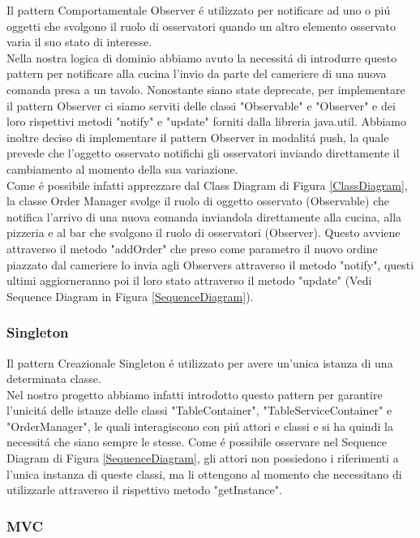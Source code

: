 \documentclass{article}
\begin{document}
Il pattern Comportamentale Observer \'e utilizzato per notificare ad uno o pi\'u oggetti che svolgono il ruolo di osservatori quando un altro elemento osservato varia il suo stato di interesse. \\
Nella nostra logica di dominio abbiamo avuto la necessit\'a di introdurre questo pattern per notificare alla cucina l'invio da parte del cameriere di una nuova comanda presa a un tavolo. Nonostante siano state deprecate, per implementare il pattern Observer ci siamo serviti delle classi "Observable" e "Observer" e dei loro rispettivi metodi "notify" e "update" forniti dalla libreria java.util. Abbiamo inoltre deciso di implementare il pattern Observer in modalit\'a push, la quale prevede che l'oggetto osservato notifichi gli osservatori inviando direttamente il cambiamento al momento della sua variazione. \\ Come \'e possibile infatti apprezzare dal Class Diagram di Figura \ref{ClassDiagram}, la classe Order Manager svolge il ruolo di oggetto osservato (Observable) che notifica l'arrivo di una nuova comanda inviandola direttamente alla cucina, alla pizzeria e al bar che svolgono il ruolo di osservatori (Observer). Questo avviene attraverso il metodo "addOrder" che preso come parametro il nuovo ordine piazzato dal cameriere lo invia agli Observers attraverso il metodo "notify", questi ultimi aggiorneranno poi il loro stato attraverso il metodo "update" (Vedi Sequence Diagram in Figura \ref{SequenceDiagram}).

\newpage

\subsubsection{Singleton}

Il pattern Creazionale Singleton \'e utilizzato per avere un'unica istanza di una determinata classe. \\
Nel nostro progetto abbiamo infatti introdotto questo pattern per garantire l'unicit\'a delle istanze delle classi "TableContainer", "TableServiceContainer" e "OrderManager", le quali interagiscono con pi\'u attori e classi e si ha quindi la necessit\'a che siano sempre le stesse. Come \'e possibile osservare nel Sequence Diagram di Figura \ref{SequenceDiagram}, gli attori non possiedono i riferimenti a l'unica instanza di queste classi, ma li ottengono al momento che necessitano di utilizzarle attraverso il rispettivo metodo "getInstance".

\subsubsection{MVC}
\end{document}
